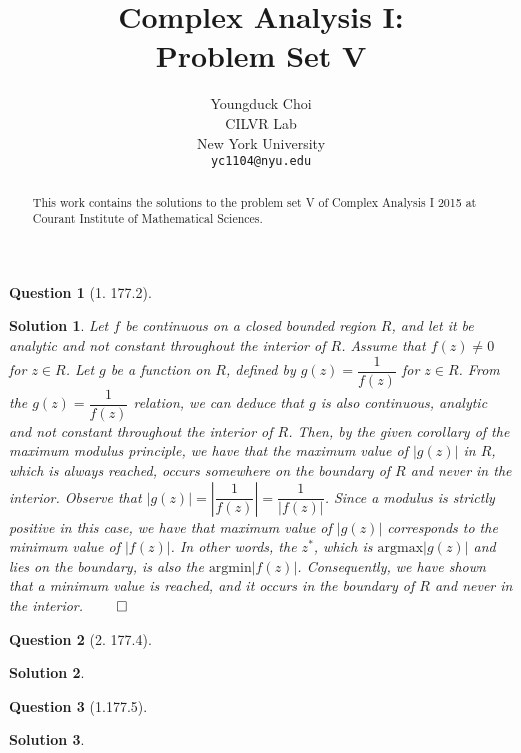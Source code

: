 \documentclass{article} %
\title{Complex Analysis I: \\
Problem Set V}
\author{
Youngduck Choi \\
CILVR Lab \\
New York University\\
\texttt{yc1104@nyu.edu} \\
}
\theoremstyle{quest}
\newtheorem*{question}{Question}
\newtheorem*{solution}{Solution}
\begin{document}
\maketitle

\begin{abstract}
This work contains the solutions to the problem set V
of Complex Analysis I 2015 at Courant Institute of Mathematical Sciences.
\end{abstract}

\bigskip

\begin{question}[1. 177.2]
\end{question}
\begin{solution}
Let $f$ be continuous on a closed bounded region $R$, and let it be
analytic and not constant throughout the interior of $R$. Assume 
that $f(z) \neq 0$ for $z \in R$. Let $g$ be a function on $R$,
defined by $g(z) = \dfrac{1}{f(z)}$ for $z \in R$. From the $g(z) = 
\dfrac{1}{f(z)}$ relation, we can deduce that
$g$ is also continuous, analytic and not constant throughout the interior
of $R$. Then, by the given corollary of the maximum modulus principle,
we have that the maximum value of $|g(z)|$ in $R$, which is always 
reached, occurs somewhere on the boundary of $R$ and never in the interior.
Observe that $|g(z)| = |\dfrac{1}{f(z)}| = \dfrac{1}{|f(z)|}$. Since
a modulus is strictly positive in this case, we have that maximum value
of $|g(z)|$ corresponds to the minimum value of $|f(z)|$. 
In other words,
the $z^*$, which is $\text{argmax} |g(z)|$ and lies on the boundary, is also
the $\text{argmin} |f(z)|$. Consequently, we have shown that a minimum
value is reached, and it occurs in the boundary of $R$ and never in
the interior. $\qed$ 
\end{solution}

\bigskip

\begin{question}[2. 177.4]
\end{question}
\begin{solution}

\end{solution}

\bigskip

\begin{question}[1.177.5]
\end{question}
\begin{solution}
\end{solution}

\bigskip
\end{document}
